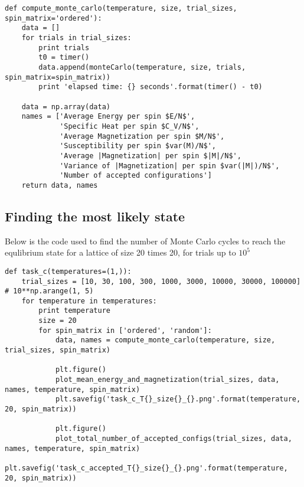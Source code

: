 \begin{lstlisting}
def compute_monte_carlo(temperature, size, trial_sizes, spin_matrix='ordered'):
    data = []
    for trials in trial_sizes:
        print trials
        t0 = timer()
        data.append(monteCarlo(temperature, size, trials, spin_matrix=spin_matrix))
        print 'elapsed time: {} seconds'.format(timer() - t0)

    data = np.array(data)
    names = ['Average Energy per spin $E/N$',
             'Specific Heat per spin $C_V/N$',
             'Average Magnetization per spin $M/N$',
             'Susceptibility per spin $var(M)/N$',
             'Average |Magnetization| per spin $|M|/N$',
             'Variance of |Magnetization| per spin $var(|M|)/N$',
             'Number of accepted configurations']
    return data, names
\end{lstlisting}


\subsection{Finding the most likely state}
Below is the code used to find the number of Monte Carlo cycles to reach the equlibrium state for a lattice of size 20 times 20, for trials up to $10^5$

\begin{lstlisting}
def task_c(temperatures=(1,)):
    trial_sizes = [10, 30, 100, 300, 1000, 3000, 10000, 30000, 100000] # 10**np.arange(1, 5)
    for temperature in temperatures:
        print temperature
        size = 20
        for spin_matrix in ['ordered', 'random']:
            data, names = compute_monte_carlo(temperature, size, trial_sizes, spin_matrix)

            plt.figure()
            plot_mean_energy_and_magnetization(trial_sizes, data, names, temperature, spin_matrix)
            plt.savefig('task_c_T{}_size{}_{}.png'.format(temperature, 20, spin_matrix))

            plt.figure()
            plot_total_number_of_accepted_configs(trial_sizes, data, names, temperature, spin_matrix)
            plt.savefig('task_c_accepted_T{}_size{}_{}.png'.format(temperature, 20, spin_matrix))
\end{lstlisting}




 

